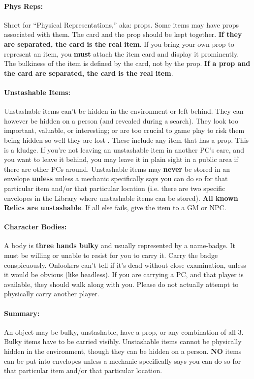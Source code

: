 \documentclass[sheet]{GL2020}
\begin{document}
\paragraph{Phys Reps:} Short for ``Physical Representations,'' aka: props. Some items may have props associated with them. The card and the prop should be kept together. \textbf{If they are separated, the card is the real item}. If you bring your own prop to represent an item, you \textbf{must} attach the item card and display it prominently. The bulkiness of the item is defined by the card, not by the prop. \textbf{If a prop and the card are separated, the card is the real item}.

\paragraph{Unstashable Items:} Unstashable items can't be hidden in the environment or left behind. They can however be hidden on a person (and revealed during a search). They look too important, valuable, or interesting; or are too crucial to game play to risk them being hidden so well they are lost . These include any item that has a prop. This is a kludge. If you're not leaving an unstashable item in another PC's care, and you want to leave it behind, you may leave it in plain sight in a public area if there are other PCs around. Unstashable items may \textbf{never} be stored in an envelope \textbf{unless} unless a mechanic specifically says you can do so for that particular item and/or that particular location (i.e. there are two specific envelopes in the Library where unstashable items can be stored). \textbf{All known Relics are unstashable}. If all else fails, give the item to a GM or NPC.

\paragraph{Character Bodies:} A body is {\bf three hands bulky} and usually represented by a name-badge. It must be willing or unable to resist for you to carry it. Carry the badge conspicuously. Onlookers can't tell if it's dead without close examination, unless it would be obvious (like headless). If you are carrying a PC, and that player is available, they should walk along with you. Please do not actually attempt to physically carry another player.

\paragraph{Summary:} An object may be bulky, unstashable, have a prop, or any combination of all 3. Bulky items have to be carried visibly. Unstashable items cannot be physically hidden in the environment, though they can be hidden on a person. \textbf{NO} items can be put into envelopes unless a mechanic specifically says you can do so for that particular item and/or that particular location.
\end{document}
